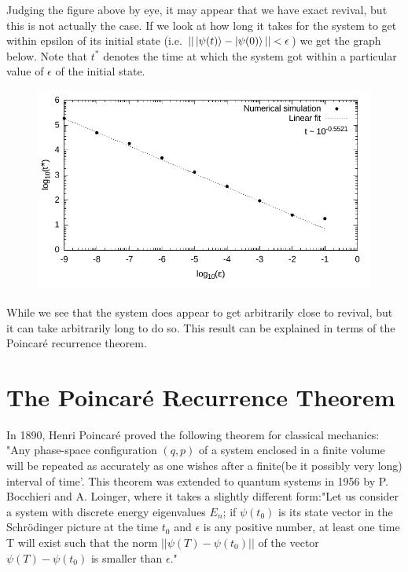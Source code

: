 \documentclass[a4paper,10pt]{article}
\begin{document}
Judging the figure above by eye, it may appear that we have exact revival, but this is not actually the case. If we look at how long it takes for the system to get within epsilon of
its initial state (i.e. $||\ket{\psi(t)}-\ket{\psi(0)}||<\epsilon$)
we get the graph below. Note that $t^*$ denotes the time at which the system got within a particular value of $\epsilon$ of the initial state.
\begin{figure}[H]
 \includegraphics[width=1.0\textwidth]{recurrence_times}
 \centering
\end{figure}
While we see that the system does appear to get arbitrarily close to revival, but it can take arbitrarily long to do so. This result can be explained in terms of the Poincar\'e recurrence theorem.
\section{The Poincar\'e Recurrence Theorem}

In 1890, Henri Poincar\'e proved the following theorem for classical mechanics: "Any phase-space configuration $(q,p)$ of a system enclosed in a finite volume will be repeated as accurately as one wishes
after a finite(be it possibly very long) interval of time'. This theorem was extended to quantum systems in 1956 by P. Bocchieri and A. Loinger\cite{Bocchieri1957}, where it takes a slightly different
form:"Let us consider a system with discrete energy eigenvalues $E_n$; if $\psi(t_0)$ is its state vector in the Schr{\"o}dinger picture at the time $t_0$ and $\epsilon$ is any positive number, at 
least one time T will exist such that the norm $||\psi(T)-\psi(t_0)||$ of the vector $\psi(T)-\psi(t_{0})$ is smaller than $\epsilon$."
\end{document}
